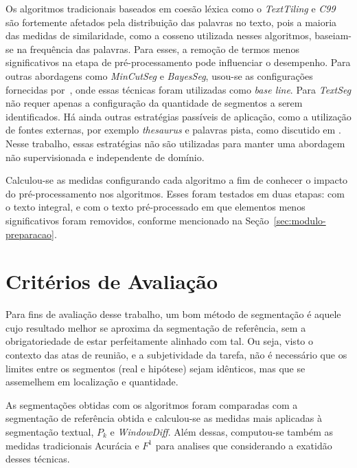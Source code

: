 Os algoritmos tradicionais baseados em coesão léxica como o \textit{TextTiling} e \textit{C99} são fortemente afetados pela distribuição das palavras no texto, pois a maioria das medidas de similaridade, como a cosseno utilizada nesses algoritmos, baseiam-se na frequência das palavras. Para esses, a remoção de termos menos significativos na etapa de pré-processamento pode influenciar o desempenho. Para outras abordagens como \textit{MinCutSeg} e \textit{BayesSeg}, usou-se as configurações fornecidas por~\cite{Eis2008}, onde essas técnicas foram utilizadas como \textit{base line}. Para \textit{TextSeg} não requer apenas a configuração da quantidade de segmentos a serem identificados.
Há ainda outras estratégias passíveis de aplicação, como a utilização de fontes externas, por exemplo \textit{thesaurus} e palavras pista, como discutido em \cite{Naili2016, Gutierrez2016, Ferret2009}. Nesse trabalho, essas estratégias não são utilizadas para manter uma abordagem não supervisionada e independente de domínio. 

Calculou-se as medidas configurando cada algoritmo
a fim de conhecer o impacto do pré-processamento nos algoritmos. 
Esses foram testados em duas etapas: com o texto integral, e com o texto pré-processado em que elementos menos significativos foram removidos, conforme mencionado na Seção~\ref{sec:modulo-preparacao}.  


\section{Critérios de Avaliação}

Para fins de avaliação desse trabalho, um bom método de segmentação é aquele cujo resultado melhor se aproxima da segmentação de referência, sem a obrigatoriedade de estar perfeitamente alinhado com tal. Ou seja, visto o contexto das atas de reunião, e a subjetividade da tarefa, não é necessário que os limites entre os segmentos (real e hipótese) sejam idênticos, mas que se assemelhem em localização e quantidade.

As segmentações obtidas com os algoritmos foram comparadas com a segmentação de referência obtida e calculou-se as medidas mais aplicadas à segmentação textual, $P_k$ e \textit{WindowDiff}. Além dessas, computou-se também as medidas tradicionais Acurácia e $F^1$ para analises que considerando a exatidão desses técnicas.


